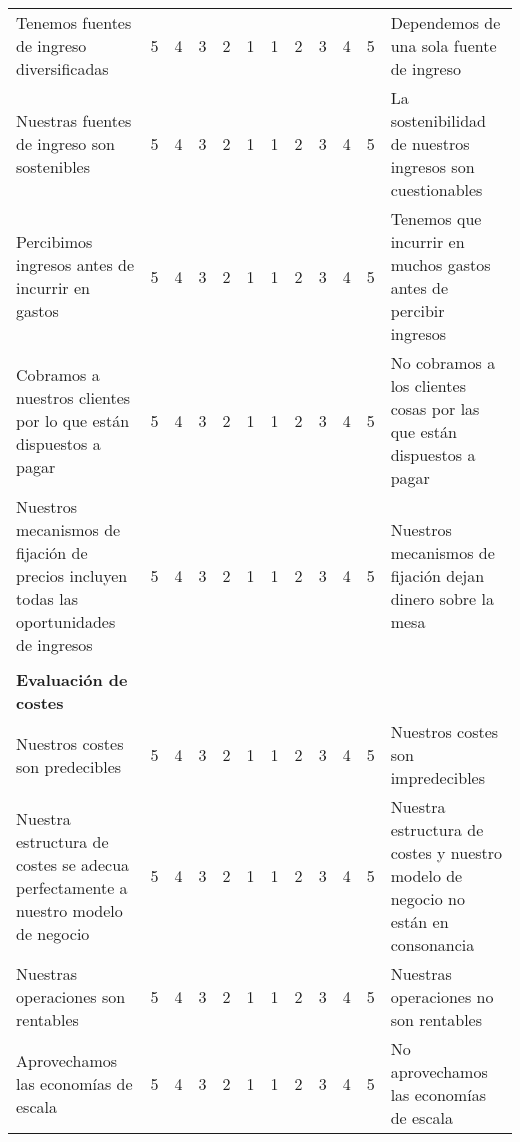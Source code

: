 \documentclass[11pt]{book}
\begin{document}
\begin{table}[htbp]
\begin{tabular}{p{14.285em}ccccc|cccccp{12em}}
    Tenemos fuentes de ingreso diversificadas & 5     & 4     & 3     & 2     & 1     & 1     & 2     & 3     & 4     & 5     & Dependemos de una sola fuente de ingreso \\
    Nuestras fuentes de ingreso son sostenibles & 5     & 4     & 3     & 2     & 1     & 1     & 2     & 3     & 4     & 5     & La sostenibilidad de nuestros ingresos son cuestionables \\
    Percibimos ingresos antes de incurrir en gastos & 5     & 4     & 3     & 2     & 1     & 1     & 2     & 3     & 4     & 5     & Tenemos que incurrir en muchos gastos antes de percibir ingresos \\
    Cobramos a nuestros clientes por lo que están dispuestos a pagar & 5     & 4     & 3     & 2     & 1     & 1     & 2     & 3     & 4     & 5     & No cobramos a los clientes cosas por las que están dispuestos a pagar \\
    Nuestros mecanismos de fijación de precios incluyen todas las oportunidades de ingresos & 5     & 4     & 3     & 2     & 1     & 1     & 2     & 3     & 4     & 5     & Nuestros mecanismos de fijación dejan dinero sobre la mesa \\
    \multicolumn{1}{r}{} &       &       &       &       & \multicolumn{1}{c}{} &       &       &       &       &       & \multicolumn{1}{r}{} \\
    \multicolumn{1}{l}{\textbf{Evaluación de costes}} &       &       &       &       & \multicolumn{1}{c}{} &       &       &       &       &       & \multicolumn{1}{r}{} \\
    Nuestros costes son predecibles & 5     & 4     & 3     & 2     & 1     & 1     & 2     & 3     & 4     & 5     & Nuestros costes son impredecibles \\
    Nuestra estructura de costes se adecua perfectamente a nuestro modelo de negocio & 5     & 4     & 3     & 2     & 1     & 1     & 2     & 3     & 4     & 5     & Nuestra estructura de costes y nuestro modelo de negocio no están en consonancia \\
    Nuestras operaciones son rentables & 5     & 4     & 3     & 2     & 1     & 1     & 2     & 3     & 4     & 5     & Nuestras operaciones no son rentables \\
    Aprovechamos las economías de escala & 5     & 4     & 3     & 2     & 1     & 1     & 2     & 3     & 4     & 5     & No aprovechamos las economías de escala \\
    \end{tabular}%
  \label{tab:addlabel}%
\end{table}%
\end{document}
